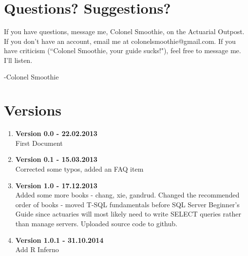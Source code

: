 \documentclass[oneside, titlepage]{article}
\begin{document}
\begin{enumerate}
\end{enumerate}

\section{Questions? Suggestions?}
If you have questions, message me, Colonel Smoothie, on the Actuarial Outpost. If you don't have an account, email me at colonelsmoothie@gmail.com. If you have criticism (``Colonel Smoothie, your guide sucks!"), feel free to message me. I'll listen.

-Colonel Smoothie

\section{Versions}
\begin{enumerate}
\item{\bfseries Version 0.0 - 22.02.2013}\\
First Document
\item{\bfseries Version 0.1 - 15.03.2013}\\
Corrected some typos, added an FAQ item
\item{\bfseries Version 1.0 - 17.12.2013}\\
Added some more books - chang, xie, gandrud. Changed the recommended order of books - moved T-SQL fundamentals before SQL Server Beginner's Guide since actuaries will most likely need to write SELECT queries rather than manage servers. Uploaded source code to github.
\item{\bfseries Version 1.0.1 - 31.10.2014}\\
Add R Inferno

\end{enumerate}
\end{document}

